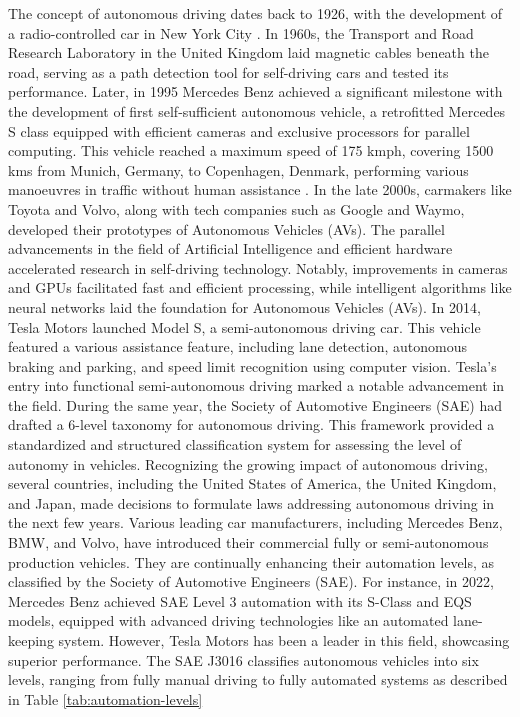 \documentclass[12pt,twoside,a4paper,parskip]{scrbook} %
\begin{document}
The concept of autonomous driving dates back to 1926, with the development of a radio-controlled car in New York City \cite{mag1926}. In 1960s, the Transport and Road Research Laboratory in the United Kingdom laid magnetic cables beneath the road, serving as a path detection tool for self-driving cars and tested its performance. Later, in 1995 Mercedes Benz achieved a significant milestone with the development of first self-sufficient autonomous vehicle, a retrofitted Mercedes S class equipped with efficient cameras and exclusive processors for parallel computing. This vehicle reached a maximum speed of 175 kmph, covering 1500 kms from Munich, Germany, to Copenhagen, Denmark, performing various manoeuvres in traffic without human assistance \cite{Mun2cop}. In the late 2000s, carmakers like Toyota and Volvo, along with tech companies such as Google and Waymo, developed their prototypes of Autonomous Vehicles (AVs). 
The parallel advancements in the field of Artificial Intelligence and efficient hardware accelerated research in self-driving technology. Notably, improvements in cameras and GPUs facilitated fast and efficient processing, while intelligent algorithms like neural networks laid the foundation for Autonomous Vehicles (AVs). In 2014, Tesla Motors launched Model S, a semi-autonomous driving car. This vehicle featured a various assistance feature, including lane detection, autonomous braking and parking, and speed limit recognition using computer vision. Tesla's entry into functional semi-autonomous driving marked a notable advancement in the field. During the same year, the Society of Automotive Engineers (SAE) had drafted a 6-level taxonomy for autonomous driving. This framework provided a standardized and structured classification system for assessing the level of autonomy in vehicles. Recognizing the growing impact of autonomous driving, several countries, including the United States of America, the United Kingdom, and Japan, made decisions to formulate laws addressing autonomous driving in the next few years. Various leading car manufacturers, including Mercedes Benz, BMW, and Volvo, have introduced their commercial fully or semi-autonomous production vehicles. They are continually enhancing their automation levels, as classified by the Society of Automotive Engineers (SAE). For instance, in 2022, Mercedes Benz achieved SAE Level 3 automation with its S-Class and EQS models, equipped with advanced driving technologies like an automated lane-keeping system. However, Tesla Motors has been a leader in this field, showcasing superior performance.
The SAE J3016 classifies autonomous vehicles into six levels, ranging from fully manual driving to fully automated systems as described in Table \ref{tab:automation-levels} \cite{sae2019}
\end{document}

